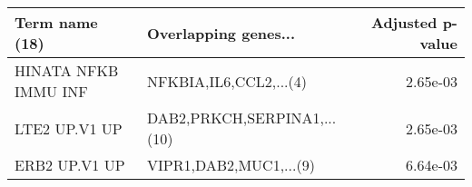 \begin{tabular}{llr}
\toprule
      Term name (18) &        Overlapping genes... &  Adjusted p-value \\
\midrule
HINATA NFKB IMMU INF &      NFKBIA,IL6,CCL2,...(4) &          2.65e-03 \\
       LTE2 UP.V1 UP & DAB2,PRKCH,SERPINA1,...(10) &          2.65e-03 \\
       ERB2 UP.V1 UP &      VIPR1,DAB2,MUC1,...(9) &          6.64e-03 \\
\bottomrule
\end{tabular}
